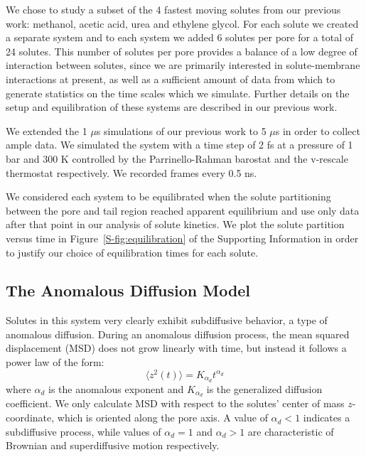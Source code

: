 \documentclass{article}
\begin{document}
  We chose to study a subset of the 4 fastest moving solutes from our previous
  work: methanol, acetic acid, urea and ethylene glycol. For each solute we 
  created a separate system and to each system we added 6 solutes per pore 
  for a total of 24 solutes. This number of solutes per pore provides a balance
  of a low degree of interaction between solutes, since we are primarily interested 
  in solute-membrane interactions at present, as well as a sufficient amount of 
  data from which to generate statistics on the time scales which we simulate.
  Further details on the setup and equilibration of these systems are described in
  our previous work.\cite{coscia_chemically_2019}
  
  We extended the 1 $\mu$s simulations of our previous work to 5 $\mu$s in order
  to collect ample data. We simulated the system with a time step of 2 fs at a pressure
  of 1 bar and 300 K controlled by the Parrinello-Rahman barostat and the v-rescale 
  thermostat respectively. We recorded frames every 0.5 ns.
  
  We considered each system to be equilibrated when the solute partitioning between the 
  pore and tail region reached apparent equilibrium and use only data after that point
  in our analysis of solute kinetics. We plot the solute partition versus time in
  Figure~\ref{S-fig:equilibration} of the Supporting Information in order to justify 
  our choice of equilibration times for each solute.

  \subsection{The Anomalous Diffusion Model}\label{method:model_sFBM}

  Solutes in this system 
  very clearly 
  exhibit 
  subdiffusive behavior, a type of anomalous diffusion.
  During an anomalous diffusion process, the mean squared displacement (MSD)
  does not grow linearly with time, but instead it follows a power law of the form:
  \begin{equation} 
  \langle z^2(t) \rangle = K_{\alpha_d}t^{\alpha_d}
  \label{eqn:msd_form}
  \end{equation} 
  where $\alpha_d$ is the anomalous exponent and $K_{\alpha_d}$ is the generalized 
  diffusion coefficient. We only calculate MSD with respect to the solutes' center of
  mass $z$-coordinate, which is oriented along the pore axis. A value of $\alpha_d < 1$
  indicates a subdiffusive process, while values of $\alpha_d = 1$ and $\alpha_d > 1$ 
  are characteristic of Brownian and superdiffusive motion respectively.
  
\end{document}
